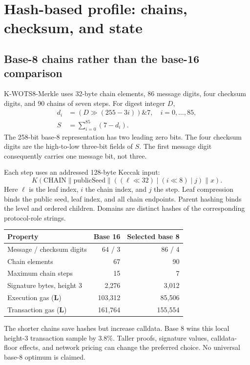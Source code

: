 \documentclass[11pt,a4paper]{article}
\newcommand{\local}{\textbf{L}}
\begin{document}
\newpage
\section{Hash-based profile: chains, checksum, and state}
\subsection{Base-8 chains rather than the base-16 comparison}
K-WOTS8-Merkle uses 32-byte chain elements, 86 message digits, four checksum
digits, and 90 chains of seven steps. For digest integer $D$,
\begin{align}
 d_i &= (D\gg(255-3i))\mathbin{\&}7,\quad i=0,\ldots,85,\\
 S &= \sum_{i=0}^{85}(7-d_i).
\end{align}
The 258-bit base-8 representation has two leading zero bits. The four
checksum digits are the high-to-low three-bit fields of $S$. The first
message digit consequently carries one message bit, not three.

Each step uses an addressed 128-byte Keccak input:
\begin{equation*}
 K(\mathrm{CHAIN}\parallel\mathrm{publicSeed}\parallel
   ((\ell\ll32)\mathbin{|}(i\ll8)\mathbin{|}j)\parallel x).
\end{equation*}
Here $\ell$ is the leaf index, $i$ the chain index, and $j$ the step. Leaf
compression binds the public seed, leaf index, and all chain endpoints.
Parent hashing binds the level and ordered children. Domains are distinct
hashes of the corresponding protocol-role strings.

\begin{tabularx}{\linewidth}{Yrr}
\toprule
\textbf{Property} & \textbf{Base 16} & \textbf{Selected base 8}\\
\midrule
Message / checksum digits & 64 / 3 & 86 / 4\\
Chain elements & 67 & 90\\
Maximum chain steps & 15 & 7\\
Signature bytes, height 3 & 2,276 & 3,012\\
Execution gas (\local) & 103,312 & 85,506\\
Transaction gas (\local) & 161,764 & 155,554\\
\bottomrule
\end{tabularx}

The shorter chains save hashes but increase calldata. Base 8 wins this local
height-3 transaction sample by 3.8\%. Taller proofs, signature
values, calldata-floor effects, and network pricing can change the preferred
choice. No universal base-8 optimum is claimed.
\end{document}
